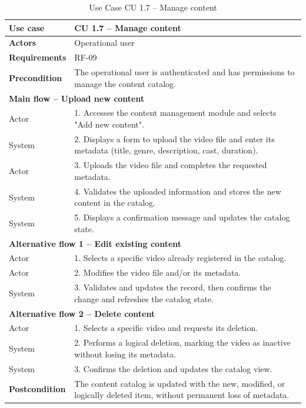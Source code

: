 \documentclass{article}
\begin{document}
\begin{table}[H]
\centering
\small
\renewcommand{\arraystretch}{1.35}
\caption{Use Case CU 1.7 -- Manage content}
\label{tab:cu1.7}
\begin{tabularx}{\textwidth}{|l|X|}
\hline
\textbf{Use case} & CU 1.7 -- Manage content \\ \hline
\textbf{Actors} & Operational user \\ \hline
\textbf{Requirements} & RF-09 \\ \hline
\textbf{Precondition} & The operational user is authenticated and has permissions to manage the content catalog. \\ \hline
\multicolumn{2}{|l|}{\textbf{Main flow -- Upload new content}} \\ \hline
Actor & 1. Accesses the content management module and selects "Add new content". \\ \hline
System & 2. Displays a form to upload the video file and enter its metadata (title, genre, description, cast, duration). \\ \hline
Actor & 3. Uploads the video file and completes the requested metadata. \\ \hline
System & 4. Validates the uploaded information and stores the new content in the catalog. \\ \hline
System & 5. Displays a confirmation message and updates the catalog state. \\ \hline
\multicolumn{2}{|l|}{\textbf{Alternative flow 1 -- Edit existing content}} \\ \hline
Actor & 1. Selects a specific video already registered in the catalog. \\ \hline
Actor & 2. Modifies the video file and/or its metadata. \\ \hline
System & 3. Validates and updates the record, then confirms the change and refreshes the catalog state. \\ \hline
\multicolumn{2}{|l|}{\textbf{Alternative flow 2 -- Delete content}} \\ \hline
Actor & 1. Selects a specific video and requests its deletion. \\ \hline
System & 2. Performs a logical deletion, marking the video as inactive without losing its metadata. \\ \hline
System & 3. Confirms the deletion and updates the catalog view. \\ \hline
\textbf{Postcondition} & The content catalog is updated with the new, modified, or logically deleted item, without permanent loss of metadata. \\ \hline
\end{tabularx}
\end{table}
\end{document}
